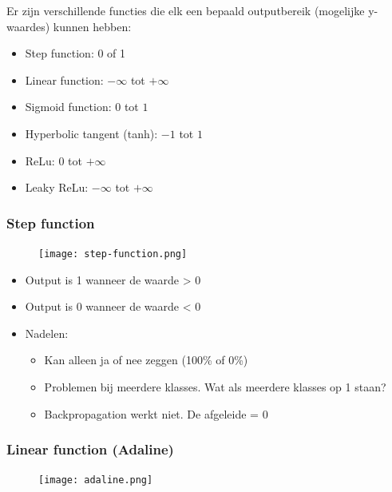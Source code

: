 \documentclass{article}
\begin{document}
Er zijn verschillende functies die elk een bepaald outputbereik (mogelijke y-waardes) kunnen hebben:

\begin{itemize}
    \item Step function: 0 of 1
    \item Linear function: $-\infty$ tot $+\infty$
    \item Sigmoid function: $0$ tot $1$
    \item Hyperbolic tangent (tanh): $-1$ tot $1$
    \item ReLu: $0$ tot $+\infty$
    \item Leaky ReLu: $-\infty$ tot $+\infty$
\end{itemize}

\subsubsection{Step function}

\begin{figure}[H]
    \centering
    \texttt{[image: step-function.png]}
\end{figure}

\begin{itemize}
    \item Output is 1 wanneer de waarde > 0
    \item Output is 0 wanneer de waarde < 0
    \item Nadelen:
    \begin{itemize}
        \item Kan alleen ja of nee zeggen (100\% of 0\%)
        \item Problemen bij meerdere klasses. Wat als meerdere klasses op 1 staan?
        \item Backpropagation werkt niet. De afgeleide = 0
    \end{itemize}
\end{itemize}


\subsubsection{Linear function (Adaline)}

\begin{figure}[H]
    \centering
    \texttt{[image: adaline.png]}
\end{figure}
\end{document}
